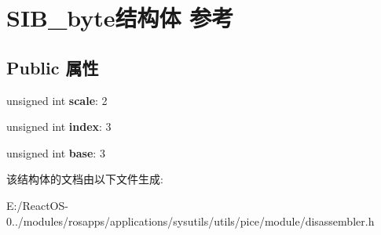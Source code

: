 \hypertarget{struct_s_i_b__byte}{}\section{S\+I\+B\+\_\+byte结构体 参考}
\label{struct_s_i_b__byte}
\subsection*{Public 属性}
\begin{DoxyCompactItemize}
\item 
\mbox{\label{struct_s_i_b__byte_a517ad9d55d5ca8bf16a42252a1926c78}} 
unsigned int {\bfseries scale}\+: 2
\item 
\mbox{\label{struct_s_i_b__byte_a235ed889bf333eb2f969d9cdf03011b2}} 
unsigned int {\bfseries index}\+: 3
\item 
\mbox{\label{struct_s_i_b__byte_a25623bdbb40e3fc59c5abc7242b27619}} 
unsigned int {\bfseries base}\+: 3
\end{DoxyCompactItemize}


该结构体的文档由以下文件生成\+:\begin{DoxyCompactItemize}
\item 
E\+:/\+React\+O\+S-\/0../modules/rosapps/applications/sysutils/utils/pice/module/disassembler.\+h\end{DoxyCompactItemize}
